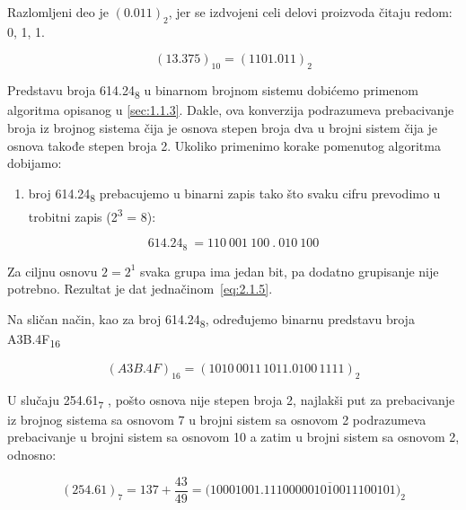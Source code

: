 \documentclass[a4paper,11pt]{article}
\numberwithin{equation}{section}
\begin{document}
Razlomljeni deo je $(0.011)_2$, jer se izdvojeni celi delovi proizvoda čitaju redom: 0, 1, 1.

\begin{equation}\label{eq:13-375}
(13.375)_{10}=(1101.011)_2
\end{equation}


Predstavu broja 614.24\textsubscript{8} u binarnom brojnom sistemu dobićemo primenom algoritma opisanog u \ref{sec:1.1.3}. Dakle, ova konverzija podrazumeva prebacivanje broja iz brojnog sistema čija je osnova stepen broja dva u brojni sistem čija je osnova takođe stepen broja 2. Ukoliko primenimo korake pomenutog algoritma dobijamo:



\begin{enumerate}[label=\arabic*),start=1,leftmargin=*]
\item broj 614.24\textsubscript{8} prebacujemo u binarni zapis tako što svaku cifru prevodimo u trobitni zapis (2\textsuperscript{3} = 8):

\end{enumerate}


\begin{equation}\label{eq:2.1.5}
{614.24}_{8}\  = 110\ 001\ 100\ .\ 010\ 100
\end{equation}


Za ciljnu osnovu $2=2^1$ svaka grupa ima jedan bit, pa dodatno grupisanje nije potrebno. Rezultat je dat jednačinom~\eqref{eq:2.1.5}.

Na sličan način, kao za broj 614.24\textsubscript{8}, određujemo binarnu predstavu broja A3B.4F\textsubscript{16}



\begin{equation}\label{eq:2.1.6}
(A3B.4F)_{16}=(1010\,0011\,1011.0100\,1111)_2
\end{equation}


U slučaju 254.61\textsubscript{7} , pošto osnova nije stepen broja 2, najlakši put za prebacivanje iz brojnog sistema sa osnovom 7 u brojni sistem sa osnovom 2 podrazumeva prebacivanje u brojni sistem sa osnovom 10 a zatim u brojni sistem sa osnovom 2, odnosno:



\begin{equation}\label{eq:2.1.7}
(254.61)_7=137+\frac{43}{49}=\bigl(10001001.\overline{111000001010011100101}\bigr)_2
\end{equation}
\end{document}
